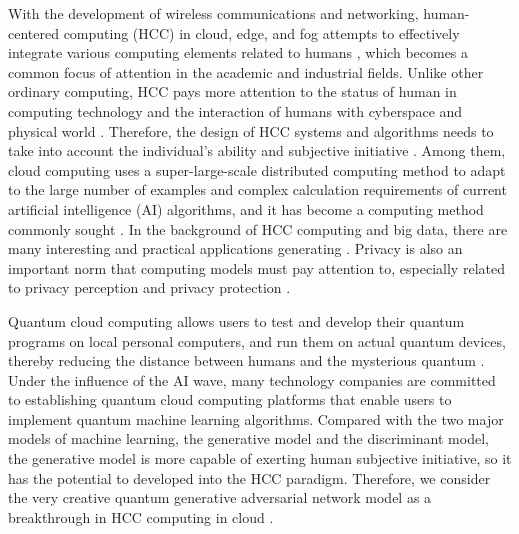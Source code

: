 \documentclass{bmcart}
\begin{document}
With the development of wireless communications and networking, human-centered computing (HCC) in cloud, edge, and fog attempts to effectively integrate various computing elements related to humans \cite{Singh,ZhouC}, which becomes a common focus of attention in the academic and industrial fields. Unlike other ordinary computing, HCC pays more attention to the status of human in computing technology and the interaction of humans with cyberspace and physical world \cite{LiuT}. Therefore, the design of HCC systems and algorithms needs to take into account the individual's ability and subjective initiative \cite{QiL,Srivastava}.
Among them, cloud computing uses a super-large-scale distributed computing method to adapt to the large number of examples and complex calculation requirements of current artificial intelligence (AI) algorithms, and it has become a computing method commonly sought \cite{XuX,Khan}.
In the background of HCC computing and big data, there are many interesting and practical applications generating \cite{WangL,XuY,LiJ}. Privacy is also an important norm that computing models must pay attention to, especially related to privacy perception and privacy protection \cite{QiLY,ZhongW,LiuQ}.

Quantum cloud computing allows users to test and develop their quantum programs on local personal computers, and run them on actual quantum devices, thereby reducing the distance between humans and the mysterious quantum \cite{Dumitrescu}. Under the influence of the AI wave, many technology companies are committed to establishing quantum cloud computing platforms that enable users to implement quantum machine learning algorithms. Compared with the two major models of machine learning, the generative model and the discriminant model, the generative model is more capable of exerting human subjective initiative, so it has the potential to developed into the HCC paradigm. Therefore, we consider the very creative quantum generative adversarial network model as a breakthrough in HCC computing in cloud .
\end{document}
